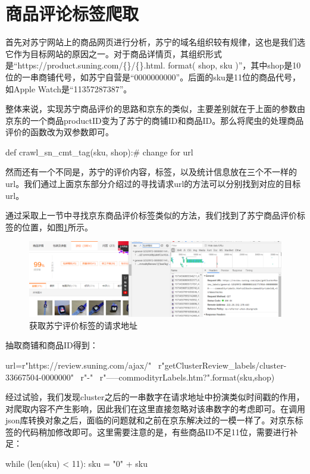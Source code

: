 \section{商品评论标签爬取}

首先对苏宁网站上的商品网页进行分析，苏宁的域名组织较有规律，这也是我们选它作为目标网站的原因之一。对于商品详情页，其组织形式是“https://product.suning.com/\{\}/\{\}.html. format( shop, sku )”，其中shop是10位的一串商铺代号，如苏宁自营是“0000000000”。后面的sku是11位的商品代号，如Apple Watch是“11357287387”。

整体来说，实现苏宁商品评价的思路和京东的类似，主要差别就在于上面的参数由京东的一个商品productID变为了苏宁的商铺ID和商品ID。那么将爬虫的处理商品评价的函数改为双参数即可。
\begin{python}
def crawl_sn_cmt_tag(sku, shop):# change for url
\end{python}

然而还有一个不同是，苏宁的评价内容，标签，以及统计信息放在三个不一样的url。我们通过上面京东部分介绍过的寻找请求url的方法可以分别找到对应的目标url。

通过采取上一节中寻找京东商品评价标签类似的方法，我们找到了苏宁商品评价标签的位置，如图\ref{img:yhb111}所示。

\begin{figure}[htbp]
\centering
\includegraphics[width=13.5cm]{img/yhb/sn_eg2.png}
\caption{获取苏宁评价标签的请求地址}
\label{img:yhb111}   %
\end{figure}

抽取商铺和商品ID得到：
\begin{python}
url=r"https://review.suning.com/ajax/" \
        r"getClusterReview_labels/cluster-33667504-0000000" \
        r"{}-{}" \
        r"-----commodityrLabels.htm?".format(sku,shop)
\end{python}


经过试验，我们发现cluster之后的一串数字在请求地址中扮演类似时间戳的作用，对爬取内容不产生影响，因此我们在这里直接忽略对该串数字的考虑即可。在调用json库转换对象之后，面临的问题就和之前在京东解决过的一模一样了。对京东标签的代码稍加修改即可。这里需要注意的是，有些商品ID不足11位，需要进行补足：
\begin{python}
while (len(sku) < 11):
                sku = "0" + sku
\end{python}


